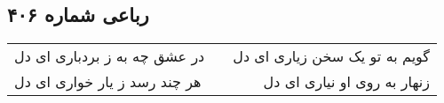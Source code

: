 \begin{center}
\section*{رباعی شماره ۴۰۶}
\label{sec:sh406}
\begin{longtable}{l p{0.5cm} r}
در عشق چه به ز بردباری ای دل
&&
گویم به تو یک سخن زیاری ای دل
\\
هر چند رسد ز یار خواری ای دل
&&
زنهار به روی او نیاری ای دل
\\
\end{longtable}
\end{center}
